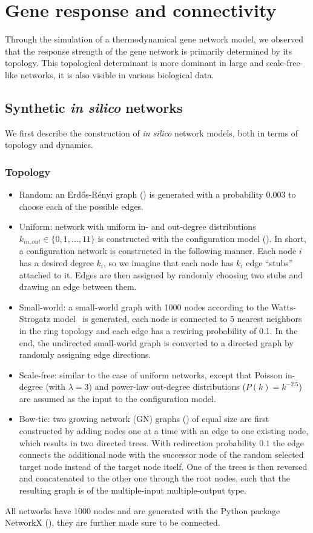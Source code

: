 \section{Gene response and connectivity}
Through the simulation of a thermodynamical gene network model, we observed that the response strength of the gene network
is primarily determined by its topology. This topological
determinant is more dominant in large and scale-free-like 
networks, it is also 
visible in various biological data.

\subsection{Synthetic \emph{in silico} networks}
We first describe the construction of \emph{in silico}
network models, both in terms of topology and dynamics.

\subsubsection{Topology}
\begin{itemize}
\item Random: an Erd\H{o}s-R\'enyi graph (\citealp{Erdos1959}) is generated with a probability
  $0.003$ to choose each of the possible edges.
\item Uniform: network with uniform in- and out-degree distributions $k_{in,out} \in 
  \{0,1,...,11\}$ is constructed 
  with the configuration model (\citealp{Newman2001}). 
  In short, a configuration network 
  is constructed in the following manner. Each node $i$ has a desired degree $k_i$, 
  so we imagine that each node has $k_i$ edge ``stubs'' attached to it. Edges are 
  then assigned by randomly choosing two stubs and drawing an edge between them.
\item Small-world: a small-world graph with 1000 nodes 
according to the 
Watts-Strogatz model~\citep{Watts1998} is generated, 
each node is connected
to 5 nearest neighbors in the ring topology and each edge
has a rewiring probability of 0.1. In the end, the 
undirected small-world graph is converted to a directed
graph by randomly assigning edge directions.
\item Scale-free: similar to the case of uniform networks,
except that Poisson in-degree (with $\lambda = 3$) and power-law 
  out-degree distributions ($P(k) = k^{-2.5}$) are assumed as the input
  to the configuration model.
\item Bow-tie: two growing network (GN) graphs 
  (\citealp{Krapivsky2001}) of equal size are first 
  constructed by adding nodes one at a time with an edge to one existing node, 
  which results in two directed trees. With redirection probability $0.1$ the edge
  connects the additional node with the successor node of the random selected target
  node instead of the target node itself. One of the trees is then reversed and 
  concatenated to the other one through the root nodes, such that the resulting
  graph is of the multiple-input multiple-output type.
\end{itemize}
All networks have 1000 nodes and are generated with the Python package NetworkX 
(\citealp{Hagberg2008}), they are further made sure to be connected.


